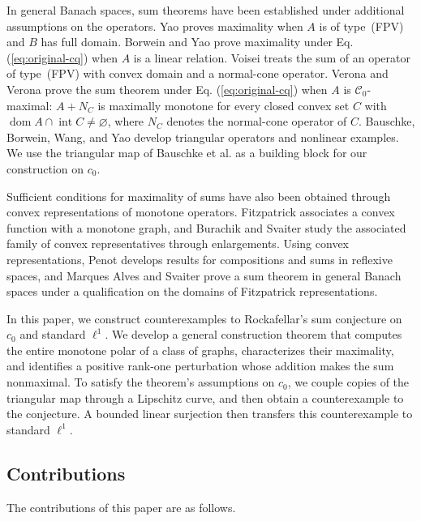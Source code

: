 \documentclass[11pt]{article}
\newcommand{\dom}{\operatorname{dom}}
\theoremstyle{definition}
\theoremstyle{remark}
\begin{document}
In general Banach spaces, sum theorems have been established under additional assumptions on the operators. Yao \cite{yao2010} proves maximality when $A$ is of type~(FPV) and $B$ has full domain. Borwein and Yao \cite{borweinyao2012} prove maximality under Eq. (\ref{eq:original-cq}) when $A$ is a linear relation. Voisei \cite{voisei2010} treats the sum of an operator of type~(FPV) with convex domain and a normal-cone operator. Verona and Verona \cite[Main Result~1.1(b)]{veronaverona2022} prove the sum theorem under Eq. (\ref{eq:original-cq}) when $A$ is $\mathcal C_0$-maximal: $A+N_C$ is maximally monotone for every closed convex set $C$ with $\dom A\cap\operatorname{int}C\ne\varnothing$, where $N_C$ denotes the normal-cone operator of $C$. Bauschke, Borwein, Wang, and Yao \cite{bauschkeetal2011} develop triangular operators and nonlinear examples. We use the triangular map of Bauschke et al. as a building block for our construction on $c_0$.

Sufficient conditions for maximality of sums have also been obtained through convex representations of monotone operators. Fitzpatrick \cite{fitzpatrick1988} associates a convex function with a monotone graph, and Burachik and Svaiter \cite{burachiksvaiter2002} study the associated family of convex representatives through enlargements. Using convex representations, Penot \cite{penot2004} develops results for compositions and sums in reflexive spaces, and Marques Alves and Svaiter \cite{marquessvaiter2012} prove a sum theorem in general Banach spaces under a qualification on the domains of Fitzpatrick representations.



In this paper, we construct counterexamples to Rockafellar's sum conjecture on $c_0$ and standard $\ell^1$. We develop a general construction theorem that computes the entire monotone polar of a class of graphs, characterizes their maximality, and identifies a positive rank-one perturbation whose addition makes the sum nonmaximal. To satisfy the theorem's assumptions on $c_0$, we couple copies of the triangular map through a Lipschitz curve, and then obtain a counterexample to the conjecture. A bounded linear surjection then transfers this counterexample to standard $\ell^1$.

\subsection{Contributions}
The contributions of this paper are as follows.
\end{document}
